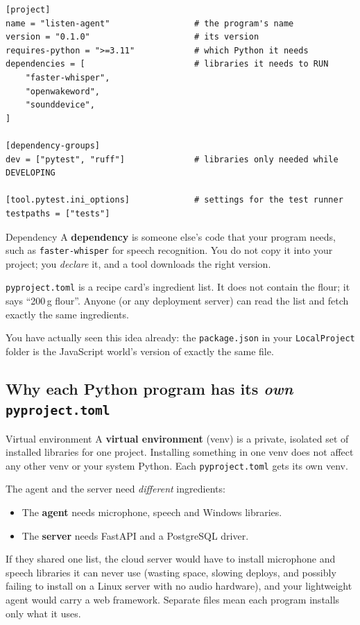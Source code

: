 \documentclass[11pt,a4paper]{article}
\begin{document}
\begin{lstlisting}
[project]
name = "listen-agent"                 # the program's name
version = "0.1.0"                     # its version
requires-python = ">=3.11"            # which Python it needs
dependencies = [                      # libraries it needs to RUN
    "faster-whisper",
    "openwakeword",
    "sounddevice",
]

[dependency-groups]
dev = ["pytest", "ruff"]              # libraries only needed while DEVELOPING

[tool.pytest.ini_options]             # settings for the test runner
testpaths = ["tests"]
\end{lstlisting}

\begin{concept}{Dependency}
A \textbf{dependency} is someone else's code that your program needs, such as
\texttt{faster-whisper} for speech recognition. You do not copy it into your project; you
\emph{declare} it, and a tool downloads the right version.
\end{concept}

\begin{analogy}
\texttt{pyproject.toml} is a recipe card's ingredient list. It does not contain the flour;
it says ``200\,g flour''. Anyone (or any deployment server) can read the list and fetch
exactly the same ingredients.
\end{analogy}

You have actually seen this idea already: the \texttt{package.json} in your
\texttt{LocalProject} folder is the JavaScript world's version of exactly the same file.

\subsection{Why each Python program has its \emph{own} \texttt{pyproject.toml}}

\begin{concept}{Virtual environment}
A \textbf{virtual environment} (venv) is a private, isolated set of installed libraries for
one project. Installing something in one venv does not affect any other venv or your system
Python. Each \texttt{pyproject.toml} gets its own venv.
\end{concept}

The agent and the server need \emph{different} ingredients:
\begin{itemize}[nosep]
  \item The \textbf{agent} needs microphone, speech and Windows libraries.
  \item The \textbf{server} needs FastAPI and a PostgreSQL driver.
\end{itemize}
If they shared one list, the cloud server would have to install microphone and speech
libraries it can never use (wasting space, slowing deploys, and possibly failing to install
on a Linux server with no audio hardware), and your lightweight agent would carry a web
framework. Separate files mean each program installs only what it uses.
\end{document}
